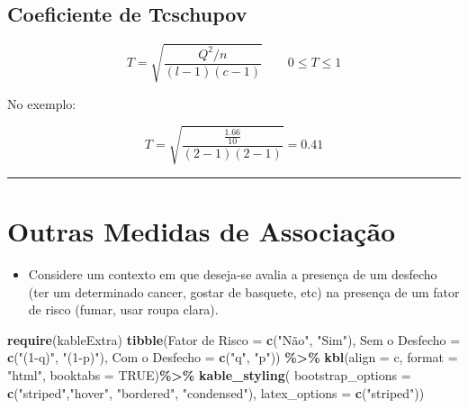 \documentclass[
]{book}
\newenvironment{Shaded}{\begin{snugshade}}{\end{snugshade}}
\newcommand{\AttributeTok}[1]{\textcolor[rgb]{0.13,0.29,0.53}{#1}}
\newcommand{\ConstantTok}[1]{\textcolor[rgb]{0.56,0.35,0.01}{#1}}
\newcommand{\FunctionTok}[1]{\textcolor[rgb]{0.13,0.29,0.53}{\textbf{#1}}}
\newcommand{\NormalTok}[1]{#1}
\newcommand{\OtherTok}[1]{\textcolor[rgb]{0.56,0.35,0.01}{#1}}
\newcommand{\SpecialCharTok}[1]{\textcolor[rgb]{0.81,0.36,0.00}{\textbf{#1}}}
\newcommand{\StringTok}[1]{\textcolor[rgb]{0.31,0.60,0.02}{#1}}
\providecommand{\tightlist}{%
  \setlength{\itemsep}{0pt}\setlength{\parskip}{0pt}}
\begin{document}
\subsection{Coeficiente de Tcschupov}\label{coeficiente-de-tcschupov}

\[T = \sqrt{\frac{Q^2/n}{(l - 1) (c - 1)}} \qquad 0\leq T\leq1\]

No exemplo:

\[T = \sqrt{\frac{\frac{1.66}{10}}{(2 - 1) (2 - 1)}} = 0.41\]

\begin{center}\rule{0.5\linewidth}{0.5pt}\end{center}

\section{Outras Medidas de Associação}\label{outras-medidas-de-associauxe7uxe3o}

\begin{itemize}
\tightlist
\item
  Considere um contexto em que deseja-se avalia a presença de um desfecho (ter um determinado cancer, gostar de basquete, etc) na presença de um fator de risco (fumar, usar roupa clara).
\end{itemize}

\begin{Shaded}
\begin{Highlighting}[]
\FunctionTok{require}\NormalTok{(kableExtra)}
\FunctionTok{tibble}\NormalTok{(}\StringTok{\textquotesingle{}Fator de Risco\textquotesingle{}} \OtherTok{=} \FunctionTok{c}\NormalTok{(}\StringTok{"Não"}\NormalTok{, }\StringTok{"Sim"}\NormalTok{), }
       \StringTok{\textquotesingle{}Sem o Desfecho\textquotesingle{}} \OtherTok{=} \FunctionTok{c}\NormalTok{(}\StringTok{"(1{-}q)"}\NormalTok{, }\StringTok{"(1{-}p)"}\NormalTok{), }
       \StringTok{\textquotesingle{}Com o Desfecho\textquotesingle{}} \OtherTok{=} \FunctionTok{c}\NormalTok{(}\StringTok{"q"}\NormalTok{, }\StringTok{"p"}\NormalTok{)) }\SpecialCharTok{\%\textgreater{}\%} 
  \FunctionTok{kbl}\NormalTok{(}\AttributeTok{align =} \StringTok{\textquotesingle{}c\textquotesingle{}}\NormalTok{, }\AttributeTok{format =} \StringTok{"html"}\NormalTok{, }\AttributeTok{booktabs =} \ConstantTok{TRUE}\NormalTok{)}\SpecialCharTok{\%\textgreater{}\%} 
  \FunctionTok{kable\_styling}\NormalTok{(}
     \AttributeTok{bootstrap\_options =} \FunctionTok{c}\NormalTok{(}\StringTok{"striped"}\NormalTok{,}\StringTok{"hover"}\NormalTok{, }\StringTok{"bordered"}\NormalTok{, }\StringTok{"condensed"}\NormalTok{), }
     \AttributeTok{latex\_options =} \FunctionTok{c}\NormalTok{(}\StringTok{"striped"}\NormalTok{))}
\end{Highlighting}
\end{Shaded}
\end{document}
